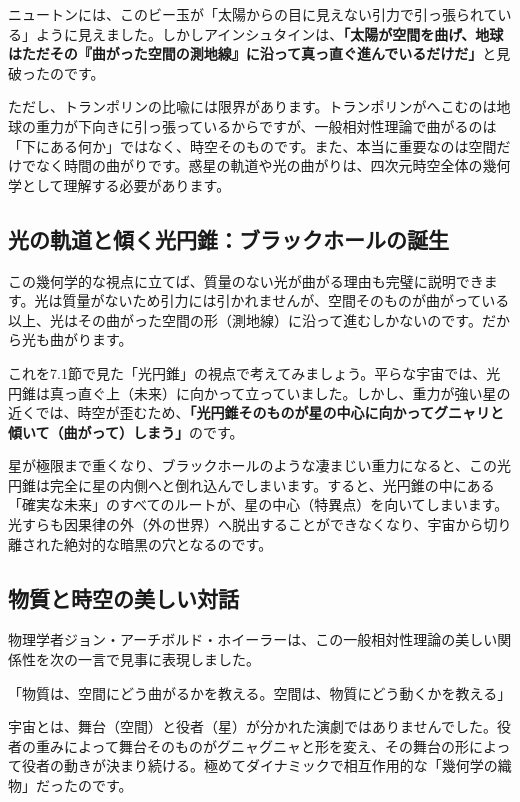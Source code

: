 ニュートンには、このビー玉が「太陽からの目に見えない引力で引っ張られている」ように見えました。しかしアインシュタインは、\textbf{「太陽が空間を曲げ、地球はただその『曲がった空間の測地線』に沿って真っ直ぐ進んでいるだけだ」}と見破ったのです。

ただし、トランポリンの比喩には限界があります。トランポリンがへこむのは地球の重力が下向きに引っ張っているからですが、一般相対性理論で曲がるのは「下にある何か」ではなく、時空そのものです。また、本当に重要なのは空間だけでなく時間の曲がりです。惑星の軌道や光の曲がりは、四次元時空全体の幾何学として理解する必要があります。

\subsection{光の軌道と傾く光円錐：ブラックホールの誕生}

この幾何学的な視点に立てば、質量のない光が曲がる理由も完璧に説明できます。光は質量がないため引力には引かれませんが、空間そのものが曲がっている以上、光はその曲がった空間の形（測地線）に沿って進むしかないのです。だから光も曲がります。

これを7.1節で見た「光円錐」の視点で考えてみましょう。平らな宇宙では、光円錐は真っ直ぐ上（未来）に向かって立っていました。しかし、重力が強い星の近くでは、時空が歪むため、\textbf{「光円錐そのものが星の中心に向かってグニャリと傾いて（曲がって）しまう」}のです。

星が極限まで重くなり、ブラックホールのような凄まじい重力になると、この光円錐は完全に星の内側へと倒れ込んでしまいます。すると、光円錐の中にある「確実な未来」のすべてのルートが、星の中心（特異点）を向いてしまいます。光すらも因果律の外（外の世界）へ脱出することができなくなり、宇宙から切り離された絶対的な暗黒の穴となるのです。

\subsection{物質と時空の美しい対話}

物理学者ジョン・アーチボルド・ホイーラーは、この一般相対性理論の美しい関係性を次の一言で見事に表現しました。

「物質は、空間にどう曲がるかを教える。空間は、物質にどう動くかを教える」

宇宙とは、舞台（空間）と役者（星）が分かれた演劇ではありませんでした。役者の重みによって舞台そのものがグニャグニャと形を変え、その舞台の形によって役者の動きが決まり続ける。極めてダイナミックで相互作用的な「幾何学の織物」だったのです。

